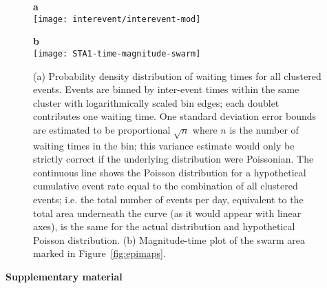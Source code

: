 \documentclass[reviewcopy]{elsarticle}
\renewcommand{\includegraphics}[2][]{\fbox{#2}}
\begin{document}
\begin{figure}
\centering

\parbox{0.65\textwidth}{{\sf \bf a}  \\
\texttt{[image: interevent/interevent-mod]}}

\parbox{0.65\textwidth}{{\sf \bf b}  \\
\texttt{[image: STA1-time-magnitude-swarm]}}



\caption{(a) Probability density distribution of waiting  times for all clustered events.  Events are binned by
inter-event times within the same cluster with logarithmically scaled
bin edges; each doublet
contributes one waiting time. One standard deviation error bounds are
estimated to be proportional $\sqrt{n}$ where $n$ is the number of
waiting times in the bin; this variance estimate would only be strictly
correct if the underlying distribution were Poissonian.  The continuous
line shows the Poisson distribution for a hypothetical cumulative
event rate equal to the combination of all clustered events; i.e. the
total number of events per day, equivalent to the total area underneath the
curve (as it would appear with linear axes), is the same for the
actual distribution and hypothetical Poisson distribution. (b)
Magnitude-time plot of the swarm area marked in
Figure~\ref{fig:epimaps}.}
\label{fig:clust-statistics}
\end{figure}


\clearpage

{\bf Supplementary material}

\appendix
\setcounter{figure}{0}
\setcounter{table}{0}
\renewcommand{\thefigure}{S\arabic{figure}}
\renewcommand{\thetable}{S\arabic{table}}


\end{document}

